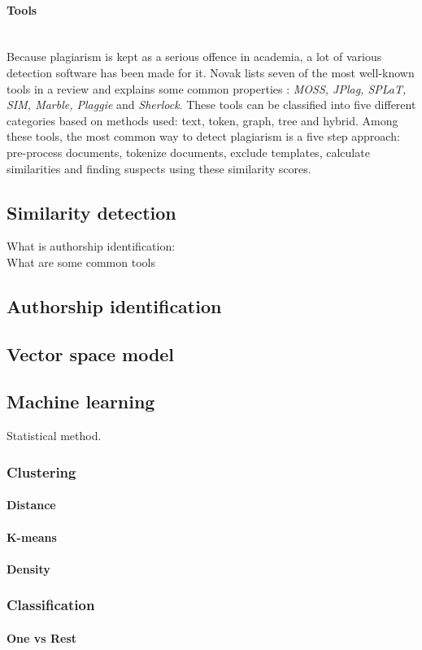 \paragraph{Tools}\mbox{}\\
Because plagiarism is kept as a serious offence in academia, a lot of various detection software has been made for it. Novak lists seven of the most well-known tools in a review and explains some common properties \cite{RSCAD2016}: \emph{MOSS, JPlag, SPLaT, SIM, Marble, Plaggie} and \emph{Sherlock}. These tools can be classified into five different categories based on methods used: text, token, graph, tree and hybrid. Among these tools, the most common way to detect plagiarism is a five step approach: pre-process documents, tokenize documents, exclude templates, calculate similarities and finding suspects using these similarity scores.

\newpage

\subsection{Similarity detection}

What is authorship identification: \cite{KRSUL1997233}\\
What are some common tools 

\subsection{Authorship identification}

\subsection{Vector space model}

\subsection{Machine learning}

Statistical method.


\subsubsection{Clustering}

\paragraph{Distance}

\paragraph{K-means}

\paragraph{Density}

\subsubsection{Classification}

\paragraph{One vs Rest}
